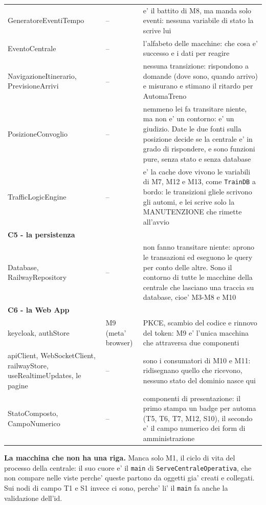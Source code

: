 \documentclass[11pt]{article}
\begin{document}
{\begin{longtable}{L{0.30\textwidth}L{0.13\textwidth}L{0.44\textwidth}}
GeneratoreEventiTempo & -- & e' il battito di M8, ma manda solo eventi: nessuna variabile di stato la scrive lui\\
EventoCentrale & -- & l'alfabeto delle macchine: che cosa e' successo e i dati per reagire\\
NavigazioneItinerario, PrevisioneArrivi & -- & nessuna transizione: rispondono a domande (dove sono, quando arrivo) e misurano e stimano il ritardo per AutomaTreno\\
PosizioneConvoglio & -- & nemmeno lei fa transitare niente, ma non e' un contorno: e' un giudizio. Date le due fonti sulla posizione decide se la centrale e' in grado di rispondere, e sono funzioni pure, senza stato e senza database\\
TrafficLogicEngine & -- & e' la cache dove vivono le variabili di M7, M12 e M13, come \texttt{TrainDB} a bordo: le transizioni gliele scrivono gli automi, e lei scrive solo la MANUTENZIONE che rimette all'avvio\\
\hline
\textbf{C5 - la persistenza} &  & \\
Database, RailwayRepository & -- & non fanno transitare niente: aprono le transazioni ed eseguono le query per conto delle altre. Sono il contorno di tutte le macchine della centrale che lasciano una traccia su database, cioe' M3-M8 e M10\\
\hline
\textbf{C6 - la Web App} &  & \\
keycloak, authStore & M9 (meta' browser) & PKCE, scambio del codice e rinnovo del token: M9 e' l'unica macchina che attraversa due componenti\\
apiClient, WebSocketClient, railwayStore, useRealtimeUpdates, le pagine & -- & sono i consumatori di M10 e M11: ridisegnano quello che ricevono, nessuno stato del dominio nasce qui\\
StatoComposto, CampoNumerico & -- & componenti di presentazione: il primo stampa un badge per automa (T5, T6, T7, M12, S10), il secondo e' il campo numerico dei form di amministrazione\\
\end{longtable}}

\textbf{La macchina che non ha una riga.} Manca solo M1, il ciclo di vita del processo della centrale: il
suo cuore e' il \texttt{main} di \texttt{ServeCentraleOperativa}, che non compare nelle viste perche' queste
partono da oggetti gia' creati e collegati. Sui nodi di campo T1 e S1 invece ci sono, perche' li'
il \texttt{main} fa anche la validazione dell'id.
\end{document}

